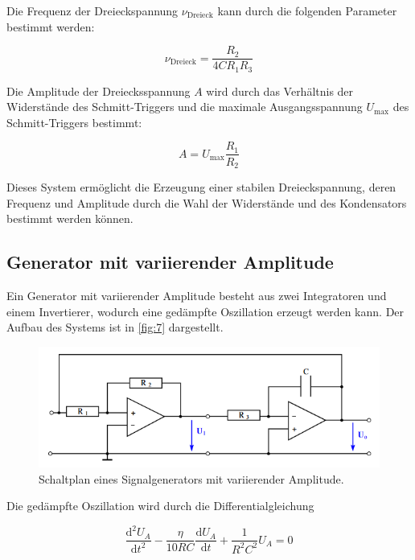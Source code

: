 \documentclass[12pt]{article}
\begin{document}
Die Frequenz der Dreieckspannung \( \nu_\text{Dreieck} \) kann durch die folgenden Parameter bestimmt werden:

\begin{equation}
    \nu_\text{Dreieck} = \frac{R_2}{4 C R_1 R_3}
    \label{eqn:fdrei}
\end{equation}

Die Amplitude der Dreiecksspannung \( A \) wird durch das Verhältnis der Widerstände des Schmitt-Triggers und die maximale Ausgangsspannung \( U_\text{max} \) des Schmitt-Triggers bestimmt:

\begin{equation}
    A = U_\text{max} \frac{R_1}{R_2}
    \label{eqn:amp2}
\end{equation}

Dieses System ermöglicht die Erzeugung einer stabilen Dreieckspannung, deren Frequenz und Amplitude durch die Wahl der Widerstände und des Kondensators bestimmt werden können.
\subsection{Generator mit variierender Amplitude}
Ein Generator mit variierender Amplitude besteht aus zwei Integratoren und einem Invertierer, wodurch eine gedämpfte Oszillation erzeugt werden kann. Der Aufbau des Systems ist in \autoref{fig:7} dargestellt.
\begin{figure}[H]
  \centering
  \includegraphics[scale=0.8]{Ressourcen/generator.png}
  \caption{Schaltplan eines Signalgenerators mit variierender Amplitude\cite{anleitung}.}\label{fig:7}
\end{figure}

Die gedämpfte Oszillation wird durch die Differentialgleichung

\begin{equation*}
    \frac{\mathrm{d}^2 U_A}{\mathrm{d}t^2} - \frac{\eta}{10RC} \frac{\mathrm{d}U_A}{\mathrm{d}t} + \frac{1}{R^2 C^2} U_A = 0
\end{equation*}
\end{document}
